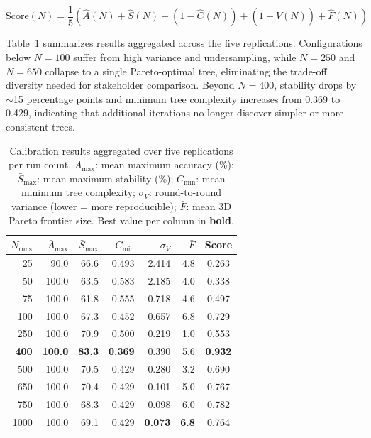\documentclass[sigconf,review]{acmart}
\begin{document}
\begin{equation}
    \text{Score}(N) = \frac{1}{5}
    \left(
        \hat{A}(N) + \hat{S}(N) + \left(1 - \hat{C}(N)\right) +
        \left(1 - \hat{V}(N)\right) + \hat{F}(N)
    \right)
    \label{eq:composite}
\end{equation}

Table~\ref{tab:run-calibration} summarizes results aggregated across the five
replications. Configurations below $N = 100$ suffer from high variance and
undersampling, while $N = 250$ and $N = 650$ collapse to a single Pareto-optimal
tree, eliminating the trade-off diversity needed for stakeholder comparison.
Beyond $N = 400$, stability drops by $\sim$15 percentage points and minimum tree
complexity increases from 0.369 to 0.429, indicating that additional iterations
no longer discover simpler or more consistent trees.

\begin{table}[ht]
\centering
\caption{Calibration results aggregated over five replications per run count.
$\bar{A}_{\max}$: mean maximum accuracy (\%); $\bar{S}_{\max}$: mean maximum
stability (\%); $C_{\min}$: mean minimum tree complexity; $\sigma_V$:
round-to-round variance (lower = more reproducible);
$\bar{F}$: mean 3D Pareto frontier size. Best value per column in \textbf{bold}.}
\label{tab:run-calibration}
\begin{tabular}{rrrrrrc}
\toprule
$N_{\text{runs}}$ & $\bar{A}_{\max}$ & $\bar{S}_{\max}$ & $C_{\min}$ &
$\sigma_V$ & $\bar{F}$ & Score \\
\midrule
25            & 90.0           & 66.6           & 0.493          & 2.414          & 4.8          & 0.263 \\
50            & 100.0          & 63.5           & 0.583          & 2.185          & 4.0          & 0.338 \\
75            & 100.0          & 61.8           & 0.555          & 0.718          & 4.6          & 0.497 \\
100           & 100.0          & 67.3           & 0.452          & 0.657          & 6.8          & 0.729 \\
250           & 100.0          & 70.9           & 0.500          & 0.219          & 1.0          & 0.553 \\
\textbf{400}  & \textbf{100.0} & \textbf{83.3}  & \textbf{0.369} & 0.390          & 5.6          & \textbf{0.932} \\
500           & 100.0          & 70.5           & 0.429          & 0.280          & 3.2          & 0.690 \\
650           & 100.0          & 70.4           & 0.429          & 0.101          & 5.0          & 0.767 \\
750           & 100.0          & 68.3           & 0.429          & 0.098          & 6.0          & 0.782 \\
1000          & 100.0          & 69.1           & 0.429          & \textbf{0.073} & \textbf{6.8} & 0.764 \\
\bottomrule
\end{tabular}
\end{table}
\end{document}
